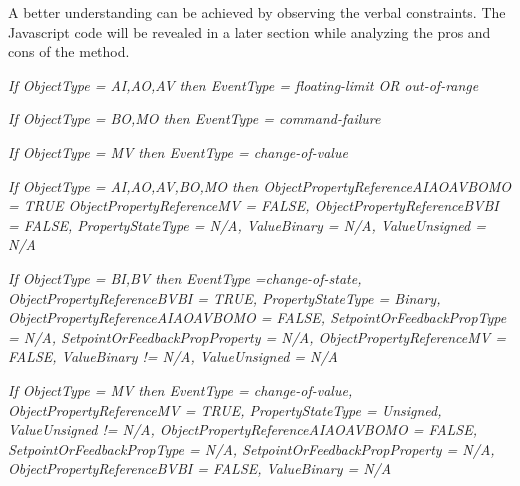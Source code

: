 \documentclass[conference]{IEEEtran}
\begin{document}
	
	A better understanding can be achieved by observing the verbal constraints.
	The Javascript code will be revealed in a later section while analyzing the pros and cons of the method. 
		
	\textsl{If ObjectType = AI,AO,AV  then  EventType = floating-limit	OR  out-of-range}
				
	\textsl{If ObjectType = BO,MO then EventType = command-failure	}			
	
	\textsl{If ObjectType = MV then EventType = change-of-value}
	
	\textsl{If ObjectType = AI,AO,AV,BO,MO then ObjectPropertyReferenceAIAOAVBOMO = TRUE
	ObjectPropertyReferenceMV = FALSE, ObjectPropertyReferenceBVBI = FALSE, PropertyStateType = N/A,
	ValueBinary = N/A, ValueUnsigned = N/A	}		
	

	\textsl{If ObjectType = BI,BV then EventType =change-of-state,  ObjectPropertyReferenceBVBI = TRUE,
	PropertyStateType = Binary, ObjectPropertyReferenceAIAOAVBOMO = FALSE, SetpointOrFeedbackPropType = N/A,
	SetpointOrFeedbackPropProperty = N/A, ObjectPropertyReferenceMV = FALSE,  ValueBinary != N/A, ValueUnsigned = N/A} 				
	

	\textsl{If ObjectType = MV then EventType = change-of-value, ObjectPropertyReferenceMV =  TRUE,
	PropertyStateType = Unsigned, ValueUnsigned != N/A, ObjectPropertyReferenceAIAOAVBOMO = FALSE,
	SetpointOrFeedbackPropType = N/A, SetpointOrFeedbackPropProperty = N/A, ObjectPropertyReferenceBVBI = FALSE,
	ValueBinary = N/A}

		
%	
\end{document}
